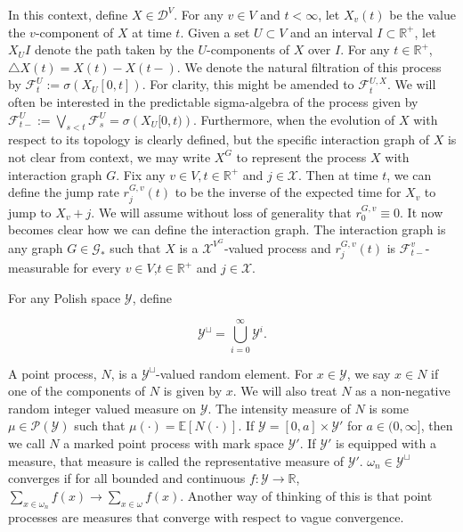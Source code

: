 \documentclass[12pt]{article}
\newcommand{\mb}{\mathbb}
\newcommand{\mc}{\mathcal}
\newcommand{\ra}{\rightarrow}
\newcommand{\ind}{\hspace{24pt}}
\newcommand{\ex}[1]{\mb{E}\left[#1\right]}			%
\newcommand{\defeq}{:=}								%
\newcommand{\pmsr}{\mc{P}}							%
\newcommand{\cad}{\mc{D}}							%
\newcommand{\sta}{\mc{X}}							%
\newcommand{\Xf}{X}									%
\newcommand{\poiss}{N}								%
\newcommand{\rate}{r}								%
\newcommand{\F}{\mc{F}}								%
\newcommand{\delt}{\triangle}						%
\newcommand{\vind}[1]{_{#1}}						%
\newcommand{\tme}[1]{(#1)}							%
\newcommand{\tmi}[1]{#1}							%
\newcommand{\gind}[1]{^{#1}}						%
\newcommand{\vpara}[1]{^{#1}}						%
\newcommand{\stpara}[1]{_{#1}}						%
\newcommand{\tpara}[1]{_{#1}}						%
\newcommand{\gvpara}[2]{^{#1,#2}}					%
\newcommand{\vpropara}[2]{^{#1,#2}}					%
\newcommand{\Gs}{\mc{G}_\ast}						%
\newcommand{\spce}{\mc{Y}}							%
\renewcommand{\it}[1]{_{#1}}						%
\begin{document}
\ind In this context, define \(\Xf \in \cad\vpara{V}\). For any \(v \in V\) and \(t < \infty\), let \(\Xf\vind{v}\tme{t}\) be the value the \(v\)-component of \(\Xf\) at time \(t\). Given a set \(U\subset V\) and an interval \(I \subset \mb{R}^+\), let \(\Xf\vind{U}\tmi{I}\) denote the path taken by the \(U\)-components of \(\Xf\) over \(\tmi{I}\). For any \(t\in\mb{R}^+\), \(\delt \Xf\tme{t} = \Xf\tme{t} - \Xf\tme{t-}\). We denote the natural filtration of this process by \(\F\vpara{U}\tpara{t} \defeq \sigma \left(\Xf\vind{U}\tmi{[0,t]}\right)\). For clarity, this might be amended to \(\F\vpropara{U}{\Xf}\tpara{t}\). We will often be interested in the predictable sigma-algebra of the process given by \(\F\vpara{U}\tpara{t-} \defeq \bigvee_{s < t} \F\vpara{U}\tpara{s} = \sigma\left(\Xf\vind{U}\tmi{[0,t)}\right)\). Furthermore, when the evolution of \(\Xf\) with respect to its topology is clearly defined, but the specific interaction graph of \(\Xf\) is not clear from context, we may write \(\Xf\gind{G}\) to represent the process \(\Xf\) with interaction graph \(G\). Fix any \(v \in V,t \in \mb{R}^+\) and \(j \in \sta\). Then at time \(t\), we can define the jump rate \(\rate\gvpara{G}{v}\stpara{j}(t)\) to be the inverse of the expected time for \(\Xf\vind{v}\) to jump to \(\Xf\vind{v} + j\). We will assume without loss of generality that \(\rate\gvpara{G}{v}\stpara{0}\equiv 0\). It now becomes clear how we can define the interaction graph. The interaction graph is any graph \(G\in \Gs\) such that \(\Xf\) is a \(\sta^{V\gind{G}}\)-valued process and \(\rate\gvpara{G}{v}\stpara{j}(t)\) is \(\F\vpara{v}\tpara{t-}\)-measurable for every \(v \in V\),\(t\in \mb{R}^+\) and \(j \in \sta\). 

\ind For any Polish space \(\spce\), define

\[\spce^\sqcup = \bigcup_{i=0}^\infty \spce^i.\]

A point process, \(\poiss\), is a \(\spce^\sqcup\)-valued random element. For \(x \in \spce\), we say \(x \in \poiss\) if one of the components of \(\poiss\) is given by \(x\). We will also treat \(\poiss\) as a non-negative random integer valued measure on \(\spce\). The intensity measure of \(\poiss\) is some \(\mu\in \pmsr(\spce)\) such that \(\mu(\cdot) = \ex{\poiss(\cdot)}\). If \(\spce = [0,a]\times \spce'\) for \(a \in (0,\infty]\), then we call \(\poiss\) a marked point process with mark space \(\spce'\). If \(\spce'\) is equipped with a measure, that measure is called the representative measure of \(\spce'\). \(\omega\it{n} \in \spce^\sqcup\) converges if for all bounded and continuous \(f: \spce \ra \mb{R}\), \(\sum_{x \in \omega\it{n}} f(x) \ra \sum_{x \in \omega} f(x)\). Another way of thinking of this is that point processes are measures that converge with respect to vague convergence.
\end{document}
